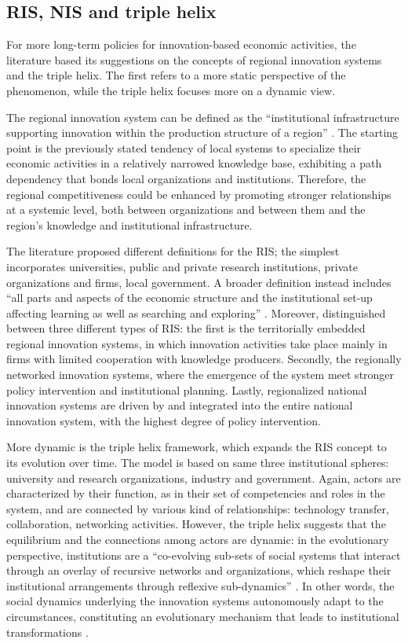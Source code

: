 \subsection{RIS, NIS and triple helix}

For more long-term policies for innovation-based economic activities, the literature based its suggestions on the concepts of regional innovation systems and the triple helix. The first refers to a more static perspective of the phenomenon, while the triple helix focuses more on a dynamic view.

The regional innovation system can be defined as the \enquote{institutional infrastructure supporting innovation within the production structure of a region} \citep{Asheim2009}. The starting point is the previously stated tendency of local systems to specialize their economic activities in a relatively narrowed knowledge base, exhibiting a path dependency that bonds local organizations and institutions. Therefore, the regional competitiveness could be enhanced by promoting stronger relationships at a systemic level, both between organizations and between them and the region's knowledge and institutional infrastructure.

The literature proposed different definitions for the RIS; the simplest incorporates universities, public and private research institutions, private organizations and firms, local government. A broader definition instead includes \enquote{all parts and aspects of the economic structure and the institutional set-up affecting learning as well as searching and exploring} \citep{Etzkowitz2000}. Moreover, \citet{Asheim2009} distinguished between three different types of RIS: the first is the territorially embedded regional innovation systems, in which innovation activities take place mainly in firms with limited cooperation with knowledge producers. Secondly, the regionally networked innovation systems, where the emergence of the system meet stronger policy intervention and institutional planning. Lastly, regionalized national innovation systems are driven by and integrated into the entire national innovation system, with the highest degree of policy intervention.

More dynamic is the triple helix framework, which expands the RIS concept to its evolution over time. The model is based on same three  institutional spheres: university and research organizations, industry and government. Again, actors are characterized by their function, as in their set of competencies and roles in the system, and are connected by various kind of relationships: technology transfer, collaboration, networking activities. However, the triple helix suggests that the equilibrium and the connections among actors are dynamic: in the evolutionary perspective, institutions are a \enquote{co-evolving sub-sets of social systems that interact through an overlay of recursive networks and organizations, which reshape their institutional arrangements through reflexive sub-dynamics} \citep{Ranga2013}. In other words, the social dynamics underlying the innovation systems autonomously adapt to the circumstances, constituting an evolutionary mechanism that leads to institutional transformations \citep{Etzkowitz2000}.

